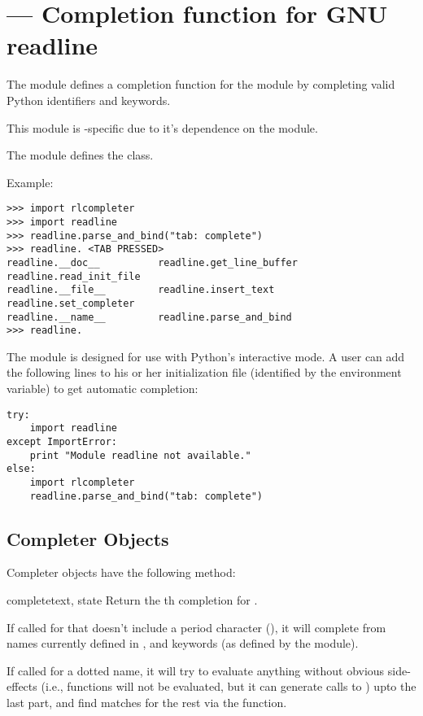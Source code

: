 \section{ ---
         Completion function for GNU readline}


The  module defines a completion function for
the  module by completing valid Python identifiers
and keywords.

This module is \UNIX-specific due to it's dependence on the
 module.

The  module defines the  class.

Example:

\begin{verbatim}
>>> import rlcompleter
>>> import readline
>>> readline.parse_and_bind("tab: complete")
>>> readline. <TAB PRESSED>
readline.__doc__          readline.get_line_buffer  readline.read_init_file
readline.__file__         readline.insert_text      readline.set_completer
readline.__name__         readline.parse_and_bind
>>> readline.
\end{verbatim}

The  module is designed for use with Python's
interactive mode.  A user can add the following lines to his or her
initialization file (identified by the 
environment variable) to get automatic  completion:

\begin{verbatim}
try:
    import readline
except ImportError:
    print "Module readline not available."
else:
    import rlcompleter
    readline.parse_and_bind("tab: complete")
\end{verbatim}


\subsection{Completer Objects \label{completer-objects}}

Completer objects have the following method:

\begin{methoddesc}[Completer]{complete}{text, state}
Return the th completion for .

If called for  that doesn't include a period character
(), it will complete from names currently defined in
,  and
keywords (as defined by the  module).

If called for a dotted name, it will try to evaluate anything without
obvious side-effects (i.e., functions will not be evaluated, but it
can generate calls to ) upto the last part, and
find matches for the rest via the  function.
\end{methoddesc}
